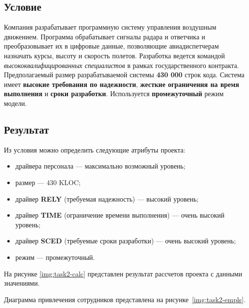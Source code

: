 \subsection{Условие}

Компания разрабатывает программную систему управления воздушным движением.
Программа обрабатывает сигналы радара и ответчика и преобразовывает их в
цифровые данные, позволяющие авиадиспетчерам назначать курсы, высоту и скорость
полетов. Разработка ведется командой \textit{высококвалифицированных
специалистов} в рамках государственного контракта. Предполагаемый размер
разрабатываемой системы \textbf{430 000} строк кода. Система имеет
\textbf{высокие требования по надежности}, \textbf{жесткие ограничения на время
выполнения} и \textbf{сроки разработки}. Используется \textbf{промежуточный}
режим модели.


\subsection{Результат}

Из условия можно определить следующие атрибуты проекта:

\begin{itemize}
    \item драйвера персонала --- максимально возможный уровень;
    \item размер --- 430 KLOC;
    \item драйвер \textbf{RELY} (требуемая надежность) --- высокий уровень;
    \item драйвер \textbf{TIME} (ограничение времени выполнения) --- очень высокий уровень;
    \item драйвер \textbf{SCED} (требуемые сроки разработки) --- очень высокий уровень;
    \item режим --- промежуточный.
\end{itemize}

На рисунке \ref{img:task2-calc} представлен результат рассчетов проекта с данными значениями.


Диаграмма привлечения сотрудников представлена на рисунке~\ref{img:task2-empls}.


